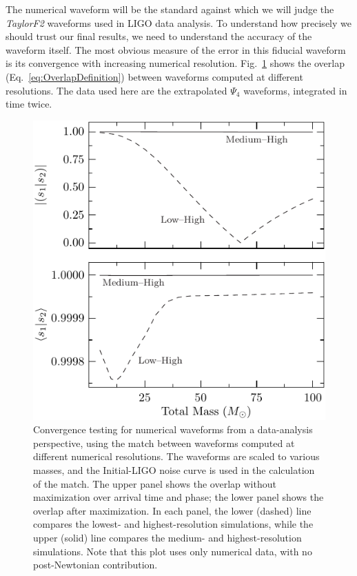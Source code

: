 The numerical waveform will be the standard against which we will
judge the \textit{TaylorF2} waveforms used in LIGO data analysis.  To
understand how precisely we should trust our final results, we need to
understand the accuracy of the waveform itself.  The most obvious
measure of the error in this fiducial waveform is its convergence with
increasing numerical resolution.  Fig.~\ref{f:accuracy} shows the
overlap (Eq.~\eqref{eq:OverlapDefinition}) between waveforms computed
at different resolutions.  The data used here are the extrapolated
$\Psi_4$ waveforms, integrated in time twice.
\begin{figure}
  \begin{center}
    \includegraphics[width=0.55\linewidth]{figures/comparison/Accuracy}
  \end{center}
  \caption[Convergence testing for numerical waveforms ]{
  \label{f:accuracy}
    Convergence testing for numerical waveforms from a
    data-analysis perspective, using the match between waveforms
    computed at different numerical resolutions.  The waveforms are
    scaled to various masses, and the Initial-LIGO noise curve is used
    in the calculation of the match.  The upper panel shows the
    overlap without maximization over arrival time and phase; the
    lower panel shows the overlap after maximization.  In each panel,
    the lower (dashed) line compares the lowest- and
    highest-resolution simulations, while the upper (solid) line
    compares the medium- and highest-resolution simulations.  Note
    that this plot uses only numerical data, with no post-Newtonian
    contribution.}
\end{figure}%

